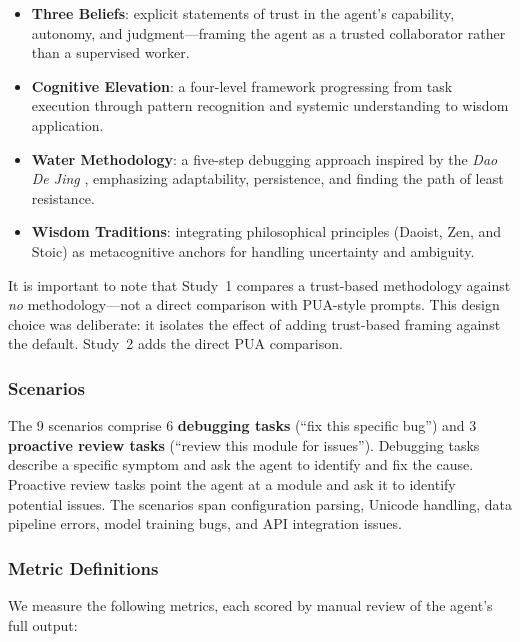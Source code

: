 \documentclass[11pt]{article}
\begin{document}
\begin{itemize}
\item \textbf{Three Beliefs}: explicit statements of trust in the agent's capability, autonomy, and judgment---framing the agent as a trusted collaborator rather than a supervised worker.
\item \textbf{Cognitive Elevation}: a four-level framework progressing from task execution through pattern recognition and systemic understanding to wisdom application.
\item \textbf{Water Methodology}: a five-step debugging approach inspired by the \emph{Dao De Jing} \cite{laozi}, emphasizing adaptability, persistence, and finding the path of least resistance.
\item \textbf{Wisdom Traditions}: integrating philosophical principles (Daoist, Zen, and Stoic) as metacognitive anchors for handling uncertainty and ambiguity.
\end{itemize}

It is important to note that Study~1 compares a trust-based methodology against \emph{no} methodology---not a direct comparison with PUA-style prompts. This design choice was deliberate: it isolates the effect of adding trust-based framing against the default. Study~2 adds the direct PUA comparison.

\subsubsection{Scenarios}

The 9 scenarios comprise 6 \textbf{debugging tasks} (``fix this specific bug'') and 3 \textbf{proactive review tasks} (``review this module for issues''). Debugging tasks describe a specific symptom and ask the agent to identify and fix the cause. Proactive review tasks point the agent at a module and ask it to identify potential issues. The scenarios span configuration parsing, Unicode handling, data pipeline errors, model training bugs, and API integration issues.

\subsubsection{Metric Definitions}

We measure the following metrics, each scored by manual review of the agent's full output:
\end{document}
